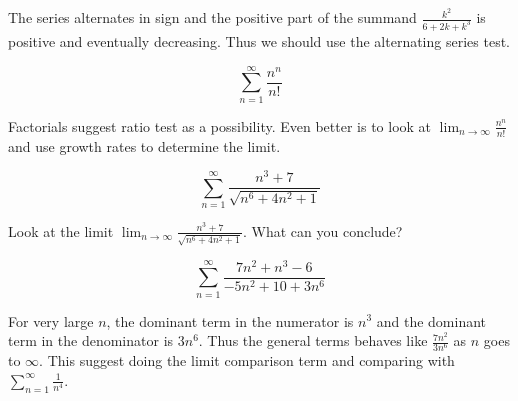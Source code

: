 \documentclass{ximera}
\begin{document}
\begin{exercise}
\begin{exercise}
\begin{multipleChoice}
\end{multipleChoice}

\begin{feedback}[correct]
The series alternates in sign and the positive part of the summand $\frac{k^2}{6+2k+k^3}$ is positive and eventually decreasing. Thus we should use the alternating series test. 
\end{feedback}
\end{exercise}

\begin{exercise}

\[
\sum^{\infty}_{n=1} \frac{n^n}{n!}
\]


\begin{multipleChoice}
\end{multipleChoice}


\begin{feedback}[correct]
Factorials suggest ratio test as a possibility. Even better is to look at $\lim_{n \to \infty} \frac{n^n}{n!}$ and use growth rates to determine the limit. 
\end{feedback}
\end{exercise}

\begin{exercise}

\[
\sum^{\infty}_{n=1} \frac{n^3+7}{\sqrt{n^6+4n^2+1}}
\]

\begin{multipleChoice}
\end{multipleChoice}



\begin{feedback}[correct]
Look at the limit $\lim_{n \to \infty} \frac{n^3+7}{\sqrt{n^6+4n^2+1}}$. What can you conclude?
\end{feedback}
\end{exercise}


\begin{exercise}


\[
\sum^{\infty}_{n=1} \frac{7n^2+n^3-6}{-5n^2+10+3n^6}
\]


\begin{multipleChoice}
\end{multipleChoice}


\begin{feedback}[correct]
For very large $n$, the dominant term in the numerator is $n^3$ and the dominant term in the denominator is $3n^6$. Thus the general terms 
behaves like $\frac{7n^2}{3n^6}$ as $n$ goes to $\infty$. This suggest doing the limit comparison term and comparing with $\sum^{\infty}_{n=1} \frac{1}{n^4}$. 
\end{feedback}


\end{exercise}
\end{exercise}
\end{document}
